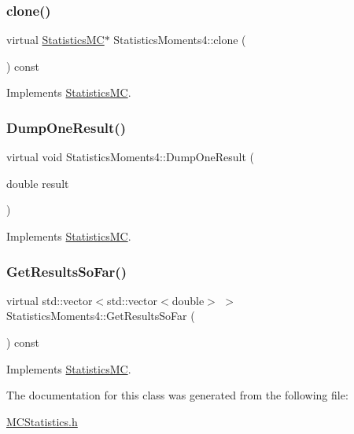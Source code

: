 \subsubsection{\texorpdfstring{clone()}{clone()}}
{\footnotesize\ttfamily virtual \hyperlink{classStatisticsMC}{Statistics\+MC}$\ast$ Statistics\+Moments4\+::clone (\begin{DoxyParamCaption}{ }\end{DoxyParamCaption}) const\hspace{0.3cm}{\ttfamily [virtual]}}



Implements \hyperlink{classStatisticsMC_af716d17e088d36f283e112ba736f8002}{Statistics\+MC}.

\hypertarget{classStatisticsMoments4_aa68d32f4eda0c2be64ef35ebac9bbe0b}{}\label{classStatisticsMoments4_aa68d32f4eda0c2be64ef35ebac9bbe0b} 
\subsubsection{\texorpdfstring{Dump\+One\+Result()}{DumpOneResult()}}
{\footnotesize\ttfamily virtual void Statistics\+Moments4\+::\+Dump\+One\+Result (\begin{DoxyParamCaption}\item[{double}]{result }\end{DoxyParamCaption})\hspace{0.3cm}{\ttfamily [virtual]}}



Implements \hyperlink{classStatisticsMC_a3ab5fb27d6933d8e35b2a55c3897cbe3}{Statistics\+MC}.

\hypertarget{classStatisticsMoments4_a46b2f0c0688de83ea348a51ea7f6eaf1}{}\label{classStatisticsMoments4_a46b2f0c0688de83ea348a51ea7f6eaf1} 
\subsubsection{\texorpdfstring{Get\+Results\+So\+Far()}{GetResultsSoFar()}}
{\footnotesize\ttfamily virtual std\+::vector$<$std\+::vector$<$double$>$ $>$ Statistics\+Moments4\+::\+Get\+Results\+So\+Far (\begin{DoxyParamCaption}{ }\end{DoxyParamCaption}) const\hspace{0.3cm}{\ttfamily [virtual]}}



Implements \hyperlink{classStatisticsMC_ae29a294b6db36c2bf46c20ac30e25aad}{Statistics\+MC}.



The documentation for this class was generated from the following file\+:\begin{DoxyCompactItemize}
\item 
\hyperlink{MCStatistics_8h}{M\+C\+Statistics.\+h}\end{DoxyCompactItemize}
